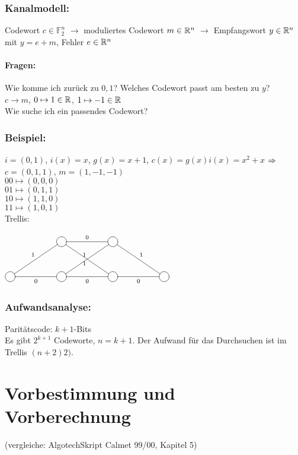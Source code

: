 \documentclass[a4paper,twoside,DIV15,BCOR12mm]{scrbook}
\begin{document}
\subsubsection{Kanalmodell: }
Codewort $c\in \mathbb{F}_2^n$ $\rightarrow$ moduliertes Codewort $m\in \mathbb{R}^n$ $\rightarrow$ Empfangswort $y\in \mathbb{R}^n$ mit $y = e + m$, Fehler $e \in \mathbb{R}^n$\\
\paragraph{Fragen:} Wie komme ich zurück zu $0,1$? Welches Codewort passt am besten zu $y$?\\
$c\rightarrow m$, $0 \mapsto 1 \in \mathbb{R}$, $1 \mapsto -1 \in \mathbb{R}$\\
Wie suche ich ein passendes Codewort?
\subsubsection{Beispiel:} 
$i=(0,1)$, $i(x)=x$, $g(x)=x+1$, $c(x)=g(x) i(x) = x^2 + x$ $\Rightarrow$ $c=(0,1,1)$, $m=(1,-1,-1)$\\
$00 \mapsto (0,0,0)$\\
$01 \mapsto (0,1,1)$\\
$10 \mapsto (1,1,0)$\\
$11 \mapsto (1,0,1)$\\
Trellis:
\begin{center}
$\begin{xy}
		\entrymodifiers={++[o][F-]}
		\xymatrix @R=30pt @C=50pt {
	  	*{} & {}\ar@{-}[r]^0\ar@{-}[rd]_1& {}\ar@{-}[rd]^1 & *{} \\ 
	  	{}\ar@{-}[ru]^1\ar@{-}[r]_0 & {}\ar@{-}[ru]^1\ar@{-}[r]_0& {}\ar@{-}[r]_0 & {}	  	
		}
\end{xy}$
\end{center}
\subsubsection{Aufwandsanalyse:}
Paritätscode: $k+1$-Bits\\
Es gibt $2^{k+1}$ Codeworte, $n=k+1$. Der Aufwand für das Durchsuchen ist im Trellis $(n+2)2)$.


\section{Vorbestimmung und Vorberechnung}
(vergleiche: AlgotechSkript Calmet 99/00, Kapitel 5)
\end{document}
